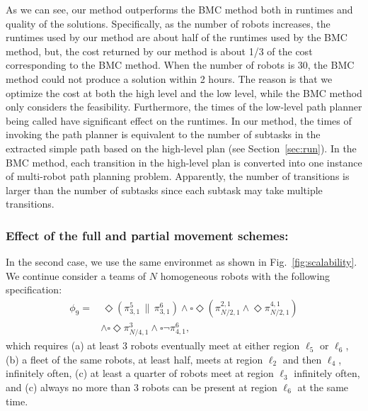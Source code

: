 \documentclass[Afour,sageh,times]{sagej}
\renewcommand{\ap}[3]{\mathcal{\pi}_{{#1},{#2}}^{#3}}
\begin{document}
{As we can see, our method outperforms the BMC method both in runtimes and quality of the solutions. Specifically, as the number of robots increases, the runtimes used by our method are about half of the runtimes used by the BMC method, but, the cost returned by our method is about 1/3 of the cost corresponding to the BMC method. When the number of robots is 30, the BMC method could not produce a solution within 2 hours. The reason is that we optimize the cost at both the high level and the low level, while the BMC method only considers the feasibility. Furthermore, the times of the low-level path planner being called have significant effect on the runtimes. In our method, the times of invoking the path planner is equivalent to the number of subtasks in the extracted simple path based on the high-level plan (see Section~\ref{sec:run}). In the BMC method, each transition in the high-level plan is converted into one instance of multi-robot path planning problem. Apparently, the number of transitions is larger than the number of subtasks since each subtask may take multiple transitions.



\subsubsection{Effect of the full and partial movement schemes:} In the second case, we use the same environmet as shown in Fig.~\ref{fig:scalability}. We continue consider a teams of $N$ homogeneous robots with the following specification:
\begin{align*}
  \phi_9 = &\, \Diamond (\ap{3}{1}{5} \,\| \, \ap{3}{1}{6}) \wedge   \square \Diamond (\ap{N/2}{1}{2,1} \wedge \Diamond \ap{N/2}{1}{4,1}) \\
  & \wedge  \square \Diamond \ap{N/4}{1}{3} \wedge \square \neg \ap{4}{1}{6},
\end{align*}
which requires (a) at least 3 robots eventually meet at either region $\ell_5$ or $\ell_6$, (b) a fleet of the same robots, at least half,  meets at region $\ell_2$ and then $\ell_4$, infinitely often, (c) at least a quarter of robots meet at region $\ell_3$ infinitely often, and (c) always no more than 3 robots can be present at region $\ell_6$ at the same time.

}
\end{document}
